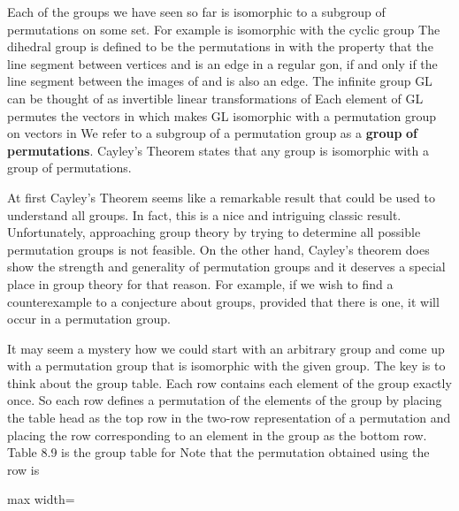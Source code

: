 \documentclass[11pt,oneside]{article}
\begin{document}
\begin{BookBody}

\noindent Each of the groups we have seen so far is isomorphic to a subgroup of permutations on some set. For example is isomorphic with the cyclic group  The dihedral group  is defined to be the permutations in  with the property that the line segment between vertices  and  is an edge in  a regular gon, if and only if the line segment between the images of  and  is also an edge. The infinite group GL can be thought of as invertible linear transformations of  Each element of GL permutes the vectors in  which makes GL isomorphic with a permutation group on vectors in  We refer to a subgroup of a permutation group as a\textbf{ group} \textbf{of permutations}. Cayley’s Theorem states that any group is isomorphic with a group of permutations.

At first Cayley’s Theorem seems like a remarkable result that could be used to understand all groups. In fact, this is a nice and intriguing classic result. Unfortunately, approaching group theory by trying to determine all possible permutation groups is not feasible. On the other hand, Cayley’s theorem does show the strength and generality of permutation groups and it deserves a special place in group theory for that reason. For example, if we wish to find a counterexample to a conjecture about groups, provided that there is one, it will occur in a permutation group.

It may seem a mystery how we could start with an arbitrary group and come up with a permutation group that is isomorphic with the given group. The key is to think about the group table. Each row contains each element of the group exactly once. So each row defines a permutation of the elements of the group by placing the table head as the top row in the two-row representation of a permutation and placing the row corresponding to an element  in the group as the bottom row. Table 8.9 is the group table for  Note that the permutation obtained using the row \BookInline{\mu \rho } is

\begin{center}\begin{adjustbox}{max width=\linewidth}\end{adjustbox}\end{center}

\end{BookBody}
\end{document}
